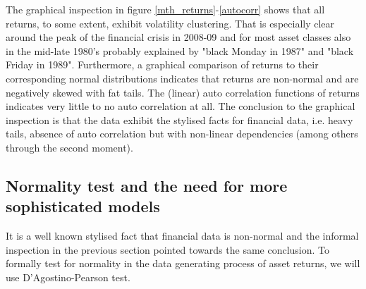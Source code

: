 \documentclass[11pt,a4paper,oneside]{article}
\begin{document}
\clearpage


\noindent The graphical inspection in figure \ref{mth_returns}-\ref{autocorr} shows that all returns, to some extent, exhibit volatility clustering. That is especially clear around the peak of the financial crisis in 2008-09 and for most asset classes also in the mid-late 1980's probably explained by "black Monday in 1987" and "black Friday in 1989". Furthermore, a graphical comparison of returns to their corresponding normal distributions indicates that returns are non-normal and are negatively skewed with fat tails. The (linear) auto correlation functions of returns indicates very little to no auto correlation at all. The conclusion to the graphical inspection is that the data exhibit the stylised facts for financial data, i.e. heavy tails, absence of auto correlation but with non-linear dependencies (among others through the second moment)\cite{Cont}.  





\subsection{Normality test and the need for more sophisticated models}
\noindent It is a well known stylised fact that financial data is non-normal and the informal inspection in the previous section pointed towards the same conclusion. To formally test for normality in the data generating process of asset returns, we will use D’Agostino-Pearson test.    


  
\clearpage  
  


\clearpage
\end{document}
